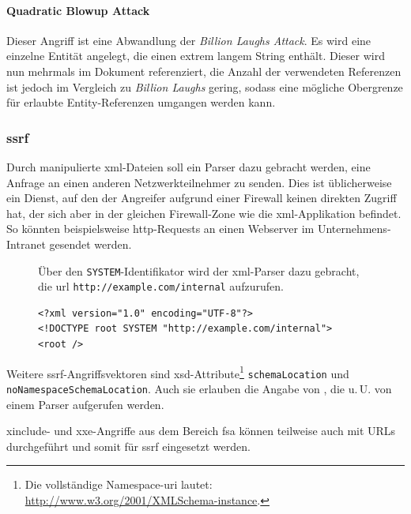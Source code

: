 \paragraph{Quadratic Blowup Attack}
Dieser Angriff ist eine Abwandlung der \emph{Billion Laughs Attack}. Es wird eine einzelne Entität angelegt, die einen extrem langem String enthält. Dieser wird nun mehrmals im Dokument referenziert, die Anzahl der verwendeten Referenzen ist jedoch im Vergleich zu \emph{Billion Laughs} gering, sodass eine mögliche Obergrenze für erlaubte Entity-Referenzen umgangen werden kann.

\subsubsection{\acrlong{ssrf}}
\label{sec:xmlattacks-ssrf}

Durch manipulierte \acrshort{xml}-Dateien soll ein Parser dazu gebracht werden, eine Anfrage an einen anderen Netzwerkteilnehmer zu senden. Dies ist üblicherweise ein Dienst, auf den der Angreifer aufgrund einer Firewall keinen direkten Zugriff hat, der sich aber in der gleichen Firewall-Zone wie die \acrshort{xml}-Applikation befindet. So könnten beispielsweise \acrshort{http}-Requests an einen Webserver im Unternehmens-Intranet gesendet werden.

\begin{figure}[h]
    \begin{example} Über den \texttt{SYSTEM}-Identifikator wird der \acrshort{xml}-Parser dazu gebracht, die \acrshort{url} \texttt{http://example.com/internal} aufzurufen.
        \begin{verbatim}
<?xml version="1.0" encoding="UTF-8"?>
<!DOCTYPE root SYSTEM "http://example.com/internal">
<root />
        \end{verbatim}
    \end{example}
\end{figure}

Weitere \acrshort{ssrf}-Angriffsvektoren sind \acrshort{xsd}-Attribute\footnote{Die vollständige Namespace-\acrshort{uri} lautet: \url{http://www.w3.org/2001/XMLSchema-instance}.} \texttt{schemaLocation} und \texttt{noNamespace\-SchemaLocation}. Auch sie erlauben die Angabe von , die u.\,U. von einem Parser aufgerufen werden.\cite[S.~8f]{morgan2014xml}

\acrshort{xinclude}- und \acrshort{xxe}-Angriffe aus dem Bereich \acrlong{fsa} können teilweise auch mit URLs durchgeführt und somit für \acrlong{ssrf} eingesetzt werden.

